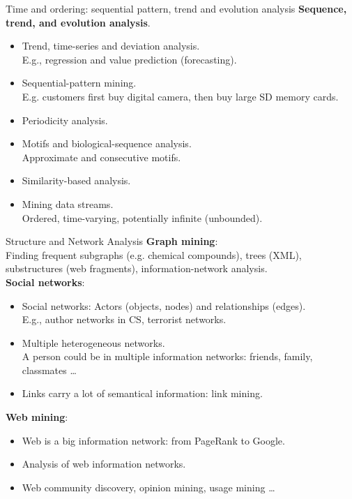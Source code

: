 \documentclass[aspectratio=169,t]{beamer}
\begin{document}
  {
    \begin{frame}{Time and ordering: sequential pattern, trend and evolution analysis}
    \textbf{Sequence, trend, and evolution analysis}.\\
    \begin{itemize}
        \item Trend, time-series and deviation analysis. \\
              E.g., regression and value prediction (forecasting).
        \item Sequential-pattern mining.\\
              E.g. customers first buy digital camera, then buy large SD memory cards.
        \item Periodicity analysis.
        \item Motifs and biological-sequence analysis.\\
              Approximate and consecutive motifs.
        \item Similarity-based analysis.\\
        \item Mining data streams.\\
              Ordered, time-varying, potentially infinite (unbounded).
    \end{itemize}
    \end{frame}
  }

  {
    \begin{frame}{Structure and Network Analysis}
    \textbf{Graph mining}:\\
    Finding frequent subgraphs (e.g. chemical compounds), trees (XML), substructures (web fragments), information-network analysis.\\[0.2cm]

    \textbf{Social networks}:
    \begin{itemize}
        \item Social networks: Actors (objects, nodes) and relationships (edges).\\
              E.g., author networks in CS, terrorist networks.
        \item Multiple heterogeneous networks.\\
              A person could be in multiple information networks: friends, family, classmates \ldots
        \item Links carry a lot of semantical information: link mining.
    \end{itemize}

    \textbf{Web mining}:
    \begin{itemize}
        \item Web is a big information network: from PageRank to Google.
        \item Analysis of web information networks.
        \item Web community discovery, opinion mining, usage mining \ldots
    \end{itemize}
    \end{frame}
  }
\end{document}
